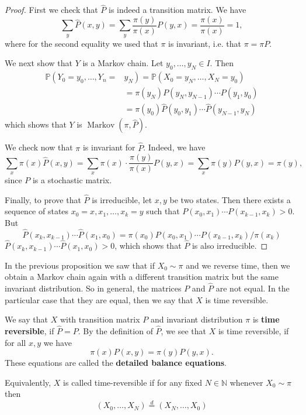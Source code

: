 \documentclass[a4paper,11pt]{article}
\begin{document}
\begin{proof}
    First we check that $\widehat{P}$ is indeed a transition matrix. We have
    \[
    \sum_y \widehat{P}(x, y)=\sum_y \frac{\pi(y)}{\pi(x)} P(y, x)=\frac{\pi(x)}{\pi(x)}=1,
    \]
    where for the second equality we used that $\pi$ is invariant, i.e. that $\pi=\pi P$.

    We next show that $Y$ is a Markov chain. Let $y_0, \ldots, y_N \in I$. Then
    \[
    \begin{aligned}
    \mathbb{P}\left(Y_0=y_0, \ldots, Y_n=\right.&\left.y_N\right)=\mathbb{P}\left(X_0=y_N, \ldots, X_N=y_0\right) \\
    &=\pi\left(y_N\right) P\left(y_N, y_{N-1}\right) \cdots P\left(y_1, y_0\right) \\
    &=\pi\left(y_0\right) \widehat{P}\left(y_0, y_1\right) \cdots \widehat{P}\left(y_{N-1},     y_N\right)
    \end{aligned}
    \]
    which shows that $Y$ is $\operatorname{Markov}(\pi, \widehat{P})$.

    We check now that $\pi$ is invariant for $\widehat{P}$. Indeed, we have
    \[
    \sum_x \pi(x) \widehat{P}(x, y)=\sum_x \pi(x) \cdot \frac{\pi(y)}{\pi(x)} P(y, x)=\sum_x \pi(y) P(y, x)=\pi(y),
    \]
    since $P$ is a stochastic matrix.

    Finally, to prove that $\widehat{P}$ is irreducible, let $x, y$ be two states. Then there exists a sequence of states $x_0=x, x_1, \ldots, x_k=y$ such that $P\left(x_0, x_1\right) \cdots P\left(x_{k-1}, x_k\right)>0$. But
    \[
    \widehat{P}\left(x_k, x_{k-1}\right) \cdots \widehat{P}\left(x_1, x_0\right)=\pi\left(x_0\right) P\left(x_0, x_1\right) \cdots P\left(x_{k-1}, x_k\right) / \pi\left(x_k\right)
    \]
    $\widehat{P}\left(x_k, x_{k-1}\right) \cdots \widehat{P}\left(x_1, x_0\right)>0$, which shows that $\widehat{P}$ is also irreducible.   
\end{proof}

In the previous proposition we saw that if $X_0 \sim \pi$ and we reverse time, then we obtain a Markov chain again with a different transition matrix but the same invariant distribution. So in general, the matrices $P$ and $\widehat{P}$ are not equal. In the particular case that they are equal, then we say that $X$ is time reversible.

\begin{definition}
    We say that $X$ with transition matrix $P$ and invariant distribution $\pi$ is \textbf{time reversible}, if $\widehat{P}=P$. By the definition of $\widehat{P}$, we see that $X$ is time reversible, if for all $x, y$ we have
    \[
    \pi(x) P(x, y)=\pi(y) P(y, x) .
    \]
    These equations are called the \textbf{detailed balance equations}.

    Equivalently, $X$ is called time-reversible if for any fixed $N \in \mathbb{N}$ whenever $X_0 \sim \pi$ then
    \[
    \left(X_0, \ldots, X_N\right) \stackrel{d}{=}\left(X_N, \ldots, X_0\right)
    \]
\end{definition}
\end{document}
